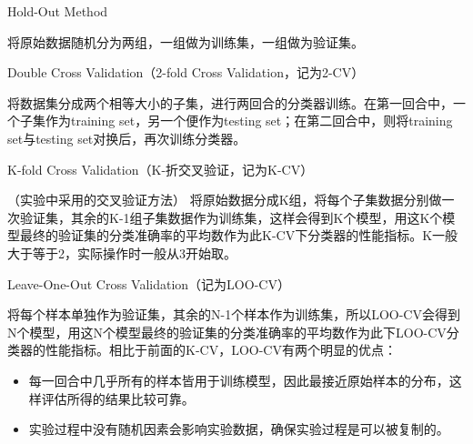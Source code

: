 \begin{itemize}
    \item Hold-Out Method
    
    将原始数据随机分为两组，一组做为训练集，一组做为验证集。
    \item Double Cross Validation（2-fold Cross Validation，记为2-CV）
    
    将数据集分成两个相等大小的子集，进行两回合的分类器训练。在第一回合中，一个子集作为training set，另一个便作为testing set；在第二回合中，则将training set与testing set对换后，再次训练分类器。
    {\color{blue}\item K-fold Cross Validation（K-折交叉验证，记为K-CV）}（实验中采用的交叉验证方法）
    \label{kCM}
    将原始数据分成K组，将每个子集数据分别做一次验证集，其余的K-1组子集数据作为训练集，这样会得到K个模型，用这K个模型最终的验证集的分类准确率的平均数作为此K-CV下分类器的性能指标。K一般大于等于2，实际操作时一般从3开始取。
    \item Leave-One-Out Cross Validation（记为LOO-CV）
    
    将每个样本单独作为验证集，其余的N-1个样本作为训练集，所以LOO-CV会得到N个模型，用这N个模型最终的验证集的分类准确率的平均数作为此下LOO-CV分类器的性能指标。相比于前面的K-CV，LOO-CV有两个明显的优点：
    \begin{itemize}
        \item 每一回合中几乎所有的样本皆用于训练模型，因此最接近原始样本的分布，这样评估所得的结果比较可靠。
        \item 实验过程中没有随机因素会影响实验数据，确保实验过程是可以被复制的。
    \end{itemize}
\end{itemize}
